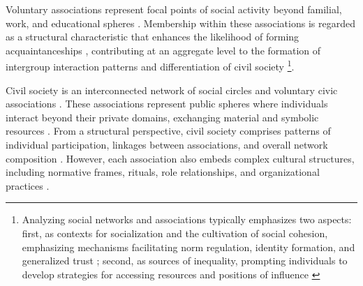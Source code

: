 Voluntary associations represent focal points of social activity beyond familial, work, and educational spheres \parencite{knoke_associations_1986}. Membership within these associations is regarded as a structural characteristic that enhances the likelihood of forming acquaintanceships \parencite{mcpherson_hypernetwork_1982, feld_focused_1981}, contributing at an aggregate level to the formation of intergroup interaction patterns and differentiation \parencite{blau_exchange_1986} of civil society \footnote{Analyzing social networks and associations typically emphasizes two aspects: first, as contexts for socialization and the cultivation of social cohesion, emphasizing mechanisms facilitating norm regulation, identity formation, and generalized trust \parencite{glanville_voluntary_2004,glanville_why_2016,paxton_association_2007,paxton_trust_2018}; second, as sources of inequality, prompting individuals to develop strategies for accessing resources and positions of influence \parencite{bekkers_social_2008, diani_cement_2015, brashears_organizations_2017, gould_multiple_1991}}.
\bigskip

Civil society is an interconnected network of social circles and voluntary civic associations \parencite{putnam_making_1994, paxton_association_2007, diani_cement_2015}. These associations represent public spheres where individuals interact beyond their private domains, exchanging material and symbolic resources \parencite{alexander_civil_2006}. From a structural perspective, civil society comprises patterns of individual participation, linkages between associations, and overall network composition \parencite{diani_cement_2015, cornwell_union_2004}. However, each association also embeds complex cultural structures, including normative frames, rituals, role relationships, and organizational practices \parencite{lamont_rethinking_2000}.
\bigskip

